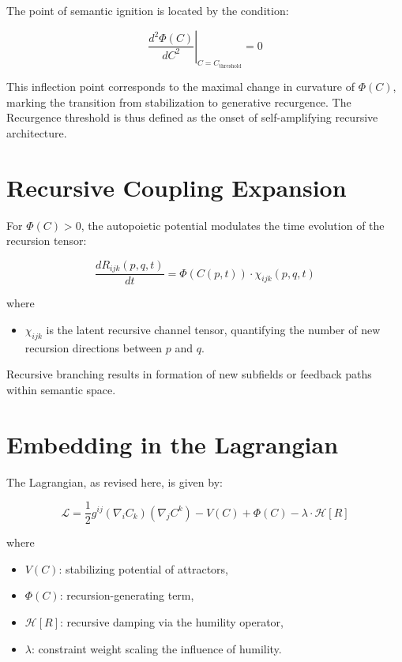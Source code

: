 The point of semantic ignition is located by the condition:

\begin{equation}
\left. \frac{d^2\Phi(C)}{dC^2} \right|_{C = C_{\text{threshold}}} = 0
\end{equation}

This inflection point corresponds to the maximal change in curvature of \(\Phi(C)\), marking the transition from stabilization to generative recurgence. The Recurgence threshold is thus defined as the onset of self-amplifying recursive architecture.

\section{Recursive Coupling Expansion}

For \(\Phi(C) > 0\), the autopoietic potential modulates the time evolution of the recursion tensor:

\begin{equation}
\frac{dR_{ijk}(p,q,t)}{dt} = \Phi(C(p,t)) \cdot \chi_{ijk}(p,q,t)
\end{equation}

where

\begin{itemize}
    \item \(\chi_{ijk}\) is the latent recursive channel tensor, quantifying the number of new recursion directions between \(p\) and \(q\).
\end{itemize}

Recursive branching results in formation of new subfields or feedback paths within semantic space.

\section{Embedding in the Lagrangian}

The Lagrangian, as revised here, is given by:

\begin{equation}
\mathcal{L} = \frac{1}{2} g^{ij} (\nabla_i C_k)(\nabla_j C^k) - V(C) + \Phi(C) - \lambda \cdot \mathcal{H}[R]
\end{equation}

where

\begin{itemize}
    \item \(V(C)\): stabilizing potential of attractors,
    \item \(\Phi(C)\): recursion-generating term,
    \item \(\mathcal{H}[R]\): recursive damping via the humility operator,
    \item \(\lambda\): constraint weight scaling the influence of humility.
\end{itemize}

